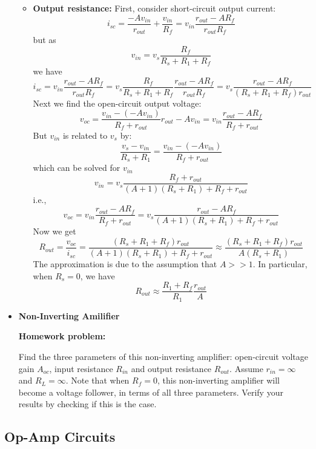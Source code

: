 \begin{itemize}
\begin{itemize}
    \item {\bf Output resistance:} First, consider short-circuit output current:
      \[ i_{sc}=\frac{-A v_{in}}{r_{out}}+\frac{v_{in}}{R_f}
      =v_{in}\frac{r_{out}-AR_f}{r_{out}R_f}     \]
      but as
      \[ v_{in}=v_s\frac{R_f}{R_s+R_1+R_f} \]
      we have
      \[ i_{sc}=v_{in}\frac{r_{out}-AR_f}{r_{out}R_f}  
      =v_s\frac{R_f}{R_s+R_1+R_f} \frac{r_{out}-AR_f}{r_{out}R_f} 
      =v_s\frac{r_{out}-AR_f}{(R_s+R_1+R_f)r_{out}}  \]
      Next we find the open-circuit output voltage:
      \[ v_{oc}=\frac{v_{in}-(-Av_{in})}{R_f+r_{out}} r_{out}-Av_{in} 
      =v_{in} \frac{r_{out}-AR_f}{R_f+r_{out}} \]
      But $v_{in}$ is related to $v_s$ by:
      \[ \frac{v_s-v_{in}}{R_s+R_1}=\frac{v_{in}-(-Av_{in})}{R_f+r_{out}} \]
      which can be solved for $v_{in}$
      \[ v_{in}=v_s \frac{R_f+r_{out}}{(A+1)(R_s+R_1)+R_f+r_{out}} \]
      i.e.,
      \[ v_{oc}=v_{in} \frac{r_{out}-AR_f}{R_f+r_{out}}
      =v_s \frac{r_{out}-AR_f}{(A+1)(R_s+R_1)+R_f+r_{out}} \]
      Now we get
      \[ R_{out}=\frac{v_{oc}}{i_{sc}}
      =\frac{(R_s+R_1+R_f)r_{out}}{(A+1)(R_s+R_1)+R_f+r_{out}}
      \approx \frac{(R_s+R_1+R_f)r_{out}}{A(R_s+R_1)} \]
      The approximation is due to the assumption that $A>>1$. In particular, when
      $R_s=0$, we have
      \[ R_{out}\approx \frac{R_1+R_f}{R_1} \frac{r_{out}}{A} \]
  \end{itemize}

\item {\bf Non-Inverting Amilifier}


  {\bf Homework problem:}

  Find the three parameters of this non-inverting amplifier: open-circuit 
  voltage gain $A_{oc}$, input resistance $R_{in}$ and output resistance $R_{out}$.
  Assume $r_{in}=\infty$ and $R_L=\infty$. Note that when $R_f=0$, this 
  non-inverting amplifier will become a voltage follower, in terms of all 
  three parameters. Verify your results by checking if this is the case.


\end{itemize}


\subsection*{Op-Amp Circuits }

